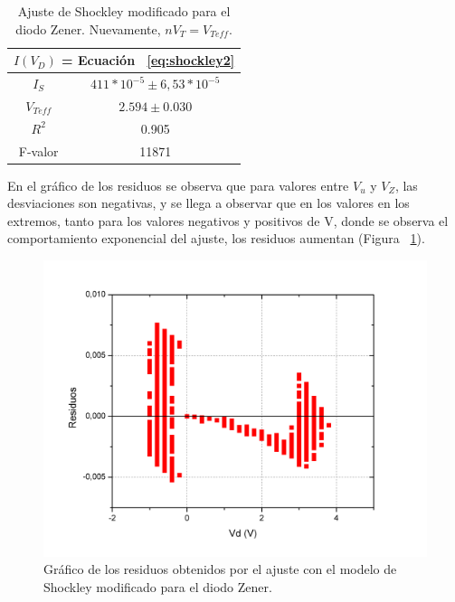 \documentclass[twoside,twocolumn,a4paper]{article}
\begin{document}
\begin{table}[h!]
\centering
\captionsetup{justification=centering}
\caption{Ajuste de Shockley modificado para el diodo Zener. Nuevamente, $nV_{T} = V_{Teff}$.}
\label{tab:zener}
\begin{tabular}{|c|c|}
\hline
\multicolumn{2}{|c|}{$I(V_D)$ = Ecuaci\'on ~\ref{eq:shockley2}} \\ \hline
$I_S$                       & $411*10^{-5}\pm6,53*10^{-5}$                   \\ \hline
$V_{Teff}$                  & $2.594\pm0.030$                  \\ \hline
$R^2$                       & 0.905                              \\ \hline
F-valor                     & 11871                            \\ \hline
\end{tabular}
\end{table}

En el gr\'afico de los residuos se observa que para valores entre $V_{u}$ y $V_{Z}$, las desviaciones son negativas, y se llega a observar que en los valores en los extremos, tanto para los valores negativos y positivos de V, donde se observa el comportamiento exponencial del ajuste, los residuos aumentan (Figura ~\ref{fig:zener_residuos}).

\begin{figure}[H]
\includegraphics[width=\linewidth]{zener_residuos.jpg}
\captionsetup{justification=centering}
\caption{Gr\'afico de los residuos obtenidos por el ajuste con el modelo de Shockley modificado para el diodo Zener.}
\label{fig:zener_residuos}
\end{figure}
\end{document}
